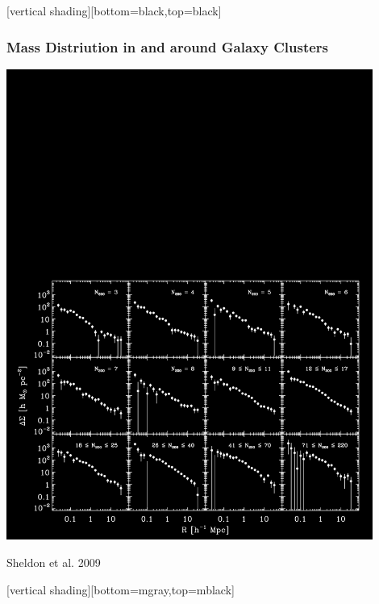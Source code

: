 \documentclass{beamer}
\begin{document}
{
    [vertical shading][bottom=black,top=black]


    \frame
    {
        \frametitle{Mass Distriution in and around Galaxy Clusters}

        \begin{center}
            \includegraphics[trim=0 0 0 800,clip,width=0.9\textwidth]{maxbcg_sample21-22_ngals200_12_jackknife_icolor.png}
        \end{center}
        \hfill {\color{gold} Sheldon et al. 2009}
    }
    [vertical shading][bottom=mgray,top=mblack]
}
\end{document}
